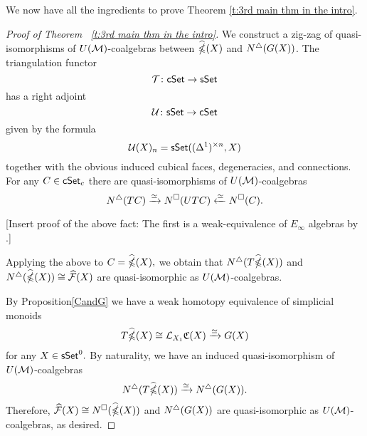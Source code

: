 We now have all the ingredients to prove Theorem \ref{t:3rd main thm in the intro}.
\begin{proof}[Proof of Theorem ~\ref{t:3rd main thm in the intro}]

We construct a zig-zag of quasi-isomorphisms of $U(\mathcal{M})$-coalgebras between $\widehat{\mathbb{\Omega}}(X)$ and $N^{\triangle} (G(X))$.
The triangulation functor $$\mathcal{T}\colon \mathsf{cSet} \to \mathsf{sSet}$$
has a right adjoint $$\mathcal{U}\colon \mathsf{sSet} \to \mathsf{cSet}$$
given by the formula
$$\mathcal{U}(X)_n= \mathsf{sSet}((\Delta^1)^{\times n}, X)$$
together with the obvious induced cubical faces, degeneracies, and connections. For any $C \in \mathsf{cSet}_c$ there are quasi-isomorphisms of $U(\mathcal{M})$-coalgebras
$$N^{\triangle}(TC) \xrightarrow{\simeq} N^{\square}(UTC) \xleftarrow{\simeq} N^{\square}(C).$$

[Insert proof of the above fact: The first is a weak-equivalence of $E_\infty$ algebras by \cite{medina2021cubical}.]

Applying the above to $C= \widehat{\mathbb{\Omega}}(X),$ we obtain that $N^{\triangle}(T\widehat{\mathbb{\Omega}}(X))$ and $N^{\triangle}(\widehat{\mathbb{\Omega}}(X)) \cong \widehat{\mathcal{F}}(X)$ are quasi-isomorphic as $U(\mathcal{M})$-coalgebras. 

By Proposition\ref{CandG} we have a weak homotopy equivalence of simplicial monoids
$$T\widehat{\mathbb{\Omega}}(X) \cong \mathcal{L}_{X_1}\mathfrak{C}(X) \xrightarrow{\simeq} G(X)$$ for any $X \in \mathsf{sSet}^0.$ By naturality, we have an induced quasi-isomorphism of $U(\mathcal{M})$-coalgebras
$$N^{\triangle}(T\widehat{\mathbb{\Omega}}(X)) \xrightarrow{\simeq} N^{\triangle}(G(X)).$$
Therefore, $\widehat{\mathcal{F}}(X) \cong N^{\square}(\widehat{\mathbb{\Omega}}(X))$ and $N^{\triangle}(G(X))$ are quasi-isomorphic as $U(\mathcal{M})$-coalgebras, as desired. 




\end{proof}